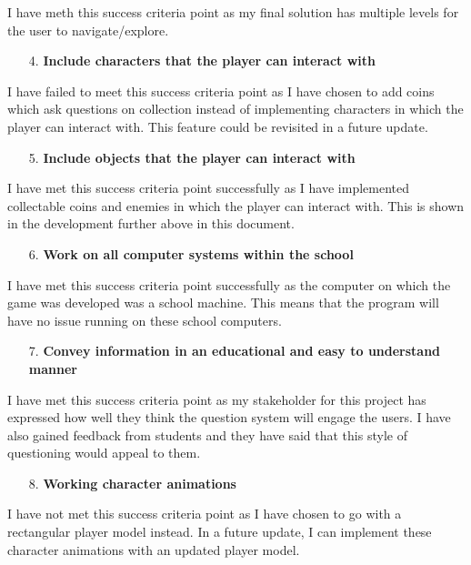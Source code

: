 \documentclass[12pt]{report}
\begin{document}
I have meth this success criteria point as my final solution has multiple levels for the user to navigate/explore.

\begin{enumerate}
    \item[4.] \textbf{Include characters that the player can interact with}
\end{enumerate}

I have failed to meet this success criteria point as I have chosen to add coins which ask questions on collection instead of implementing characters in which the player can interact with. This feature could be revisited in a future update.

\begin{enumerate}
    \item[5.] \textbf{Include objects that the player can interact with}
\end{enumerate}

I have met this success criteria point successfully as I have implemented collectable coins and enemies in which the player can interact with. This is shown in the development further above in this document.

\begin{enumerate}
    \item[6.] \textbf{Work on all computer systems within the school}
\end{enumerate}

I have met this success criteria point successfully as the computer on which the game was developed was a school machine. This means that the program will have no issue running on these school computers.

\begin{enumerate}
    \item[7.] \textbf{Convey information in an educational and easy to understand manner}
\end{enumerate}

I have met this success criteria point as my stakeholder for this project has expressed how well they think the question system will engage the users. I have also gained feedback from students and they have said that this style of questioning would appeal to them.

\begin{enumerate}
    \item[8.] \textbf{Working character animations}
\end{enumerate}

I have not met this success criteria point as I have chosen to go with a rectangular player model instead. In a future update, I can implement these character animations with an updated player model.
\end{document}

